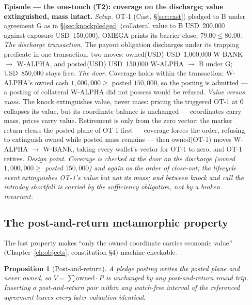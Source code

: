 \documentclass[11pt,a4paper]{article}
\newcommand{\USD}[1]{\mbox{USD~#1}}
\newtheorem{proposition}[definition]{Proposition}
\begin{document}
\medskip\noindent\textbf{Episode --- the one-touch (T2): coverage on the
discharge; value extinguished, mass intact.}
\emph{Setup.} OT-1 (Cast, \S\ref{sec:cast}) pledged to B under agreement G as in
\S\ref{sec:knockpledged} (collateral value to B \USD{200{,}000} against exposure
\USD{150{,}000}). OMEGA prints its barrier close, $79.00 \le 80.00$.
\emph{The discharge transaction.} The payout obligation discharges under its
trapping predicate in one transaction, two moves: owned(USD) \USD{1{,}000{,}000}
W-BANK $\to$ W-ALPHA, and posted(USD) \USD{150{,}000} W-ALPHA $\to$ B under G;
\USD{850{,}000} stays free.
\emph{The door.} Coverage holds within the transaction: W-ALPHA's owned cash
$1{,}000{,}000 \ge$ posted $150{,}000$, so the posting is admitted --- a posting
of collateral W-ALPHA did not possess would be refused.
\emph{Value versus mass.} The knock extinguishes value, never mass: pricing the
triggered OT-1 at $0$ collapses its value, but its coordinate balance is unchanged
--- coordinates carry mass, prices carry value. Retirement is only from the zero
vector: the marker return clears the posted plane of OT-1 first --- coverage
forces the order, refusing to extinguish owned while posted mass remains --- then
owned(OT-1) moves W-ALPHA $\to$ W-BANK, taking every wallet's vector for OT-1 to
zero, and OT-1 retires.
\emph{Design point.} \emph{Coverage is checked at the door on the discharge
(owned $1{,}000{,}000 \ge$ posted $150{,}000$) and again as the order of close-out;
the lifecycle event extinguishes OT-1's value but not its mass; and between knock
and call the intraday shortfall is carried by the sufficiency obligation, not by a
broken invariant.}

\subsection{The post-and-return metamorphic property}

The last property makes ``only the owned coordinate carries economic value''
(Chapter~\ref{ch:objects}, constitution \S 4) machine-checkable.

\begin{proposition}[Post-and-return]\label{prop:postreturn}
A pledge posting writes the posted plane and never owned, so $V=\sum
\mathrm{owned}\cdot P$ is unchanged by any post-and-return round trip. Inserting a
post-and-return pair within any watch-free interval of the referenced agreement
leaves every later valuation identical.
\end{proposition}
\end{document}
